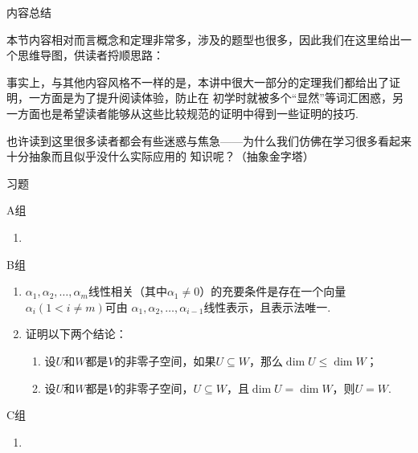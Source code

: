 \vspace{2ex}
\centerline{\heiti \Large 内容总结}
本节内容相对而言概念和定理非常多，涉及的题型也很多，因此我们在这里给出一个思维导图，供读者捋顺思路：

事实上，与其他内容风格不一样的是，本讲中很大一部分的定理我们都给出了证明，一方面是为了提升阅读体验，防止在
初学时就被多个``显然''等词汇困惑，另一方面也是希望读者能够从这些比较规范的证明中得到一些证明的技巧.

也许读到这里很多读者都会有些迷惑与焦急——为什么我们仿佛在学习很多看起来十分抽象而且似乎没什么实际应用的
知识呢？（抽象金字塔）
\vspace{2ex}

\centerline{\heiti \Large 习题}
\vspace{2ex}
{\kaishu }
\begin{flushright}
    \kaishu

\end{flushright}
\centerline{\heiti A组}
\begin{enumerate}
    \item 
\end{enumerate}
\centerline{\heiti B组}
\begin{enumerate}
    \item $\alpha_1,\alpha_2,\ldots,\alpha_m$线性相关（其中$\alpha_1\neq 0$）的充要条件是存在一个向量$\alpha_i(1<i\neq m)$可由
    $\alpha_1,\alpha_2,\ldots,\alpha_{i-1}$线性表示，且表示法唯一.
    \item 证明以下两个结论：
    \begin{enumerate}[label=(\arabic*)]
        \item 设$U$和$W$都是$V$的非零子空间，如果$U\subseteq W$，那么$\dim U \leqslant \dim W$；
        \item 设$U$和$W$都是$V$的非零子空间，$U\subseteq W$，且$\dim U = \dim W$，则$U = W$.
    \end{enumerate}
\end{enumerate}
\centerline{\heiti C组}
\begin{enumerate}
    \item
\end{enumerate}
